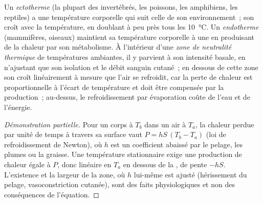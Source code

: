 \begin{proposition}\label{prop:b1:organism-environment:thermo}
Un \emph{ectotherme} (la plupart des invertébrés, les
poissons, les amphibiens, les reptiles) a une température corporelle qui
suit celle de son environnement~; son  croît avec
la température, en doublant à peu près tous les \qty{10}{\celsius}. Un
\emph{endotherme} (mammifères, oiseaux) maintient sa
température corporelle à une  en produisant de la
chaleur par son métabolisme. À l'intérieur d'une \emph{zone de
neutralité thermique} de
températures ambiantes, il y parvient à son intensité basale, en
n'ajustant que son isolation et le débit sanguin cutané~; en dessous de
cette zone son  croît linéairement à mesure que
l'air se refroidit, car la perte de chaleur est proportionnelle à
l'écart de température et doit être compensée par la production~;
au-dessus, le refroidissement par évaporation coûte de l'eau et de
l'énergie.
\end{proposition}
\begin{proof}[Démonstration partielle]
Pour un corps à $T_b$ dans un air à $T_a$, la chaleur perdue par unité
de temps à travers sa surface vaut $P = hS\,(T_b - T_a)$ (loi de
refroidissement de Newton), où $h$ est un coefficient abaissé par le
pelage, les plumes ou la graisse. Une température stationnaire exige une
production de chaleur égale à $P$, donc linéaire en $T_a$ en dessous de
la , de pente $-hS$. L'existence et la
largeur de la zone, où $h$ lui-même est ajusté (hérissement du pelage,
vasoconstriction cutanée), sont des faits physiologiques et non des
conséquences de l'équation.
\end{proof}

